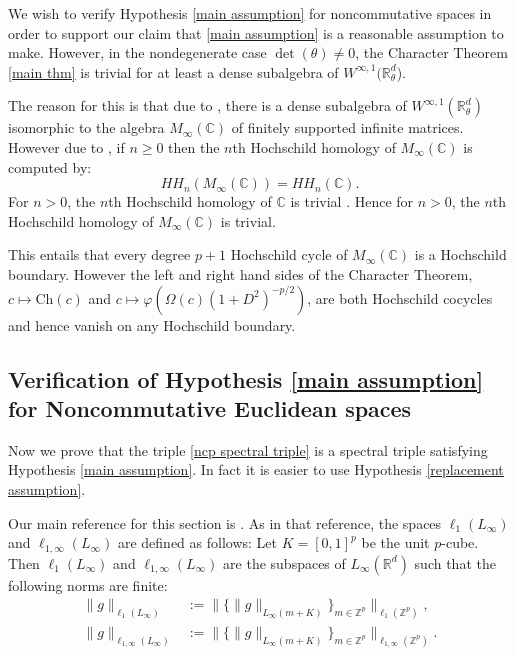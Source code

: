     We wish to verify Hypothesis \ref{main assumption} for noncommutative spaces in order to support our claim that \ref{main assumption} is a reasonable
    assumption to make. However, in the nondegenerate case $\det(\theta) \neq 0$, the Character Theorem \ref{main thm} is trivial for at least a dense
    subalgebra of $W^{\infty,1}(\mathbb{R}^d_\theta$).
    
    The reason for this is that due to \cite[Proposition 2.5]{gayral-moyal},
    there is a dense subalgebra of $W^{\infty,1}(\mathbb{R}^d_\theta)$ isomorphic to the 
    algebra $M_\infty(\mathbb{C})$ of finitely supported infinite matrices. However
    due to \cite[Theorem 1.4.14]{Loday-cyclic-homology}, if $n\geq 0$ then the
    $n$th Hochschild homology of $M_\infty(\mathbb{C})$ is computed by:
    \begin{equation*}
        HH_{n}(M_\infty(\mathbb{C})) = HH_n(\mathbb{C}).
    \end{equation*}
    For $n> 0$, the $n$th Hochschild homology of $\mathbb{C}$ is trivial \cite[Lemma 8.9]{GVF}.
    Hence for $n> 0$, the $n$th Hochschild homology of $M_\infty(\mathbb{C})$ is trivial.
    
    This entails that every degree $p+1$ Hochschild cycle of $M_\infty(\mathbb{C})$ is a Hochschild boundary. However the left and right hand sides of the Character Theorem,
    $c \mapsto \mathrm{Ch}(c)$ and $c\mapsto \varphi(\Omega(c)(1+D^2)^{-p/2})$, are
    both Hochschild cocycles and hence vanish on any Hochschild boundary.       
    
\subsection{Verification of Hypothesis \ref{main assumption} for Noncommutative Euclidean spaces}\label{ncp verification subsection}
    Now we prove that the triple \eqref{ncp spectral triple} is a spectral triple satisfying Hypothesis \ref{main assumption}. In fact
    it is easier to use Hypothesis \ref{replacement assumption}.

%     
    Our main reference for this section is \cite[Section 7]{LeSZ-cwikel}. As in that reference, the spaces $\ell_1(L_\infty)$ and $\ell_{1,\infty}(L_\infty)$ are defined as follows:
    Let $K = [0,1]^p$ be the unit $p$-cube. Then $\ell_1(L_\infty)$ and $\ell_{1,\infty}(L_\infty)$ are the subspaces of $L_\infty(\mathbb{R}^d)$ such that the following norms are finite:
    \begin{align*}
        \|g\|_{\ell_1(L_\infty)} &:= \|\{\|g\|_{L_{\infty}(m+K)}\}_{m \in \mathbb{Z}^p}\|_{\ell_1(\mathbb{Z}^p)},\\
        \|g\|_{\ell_{1,\infty}(L_\infty)} &:= \|\{\|g\|_{L_{\infty}(m+K)}\}_{m \in \mathbb{Z}^p}\|_{\ell_{1,\infty}(\mathbb{Z}^p)}.
    \end{align*}
    
